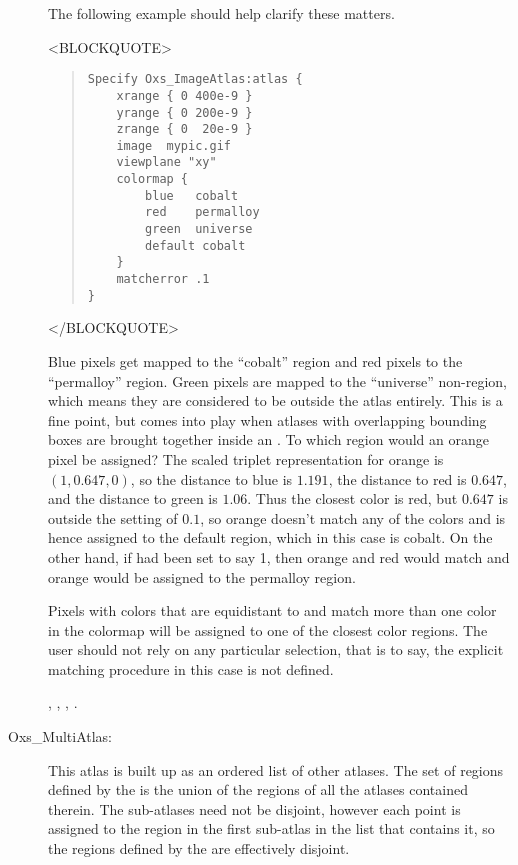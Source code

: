 \begin{description}
The following example should help clarify these matters.
\begin{rawhtml}
<BLOCKQUOTE>
\end{rawhtml}
\begin{quote}
\begin{verbatim}
Specify Oxs_ImageAtlas:atlas {
    xrange { 0 400e-9 }
    yrange { 0 200e-9 }
    zrange { 0  20e-9 }
    image  mypic.gif
    viewplane "xy"
    colormap {
        blue   cobalt
        red    permalloy
        green  universe
        default cobalt
    }
    matcherror .1
}
\end{verbatim}
\end{quote}
\begin{rawhtml}
</BLOCKQUOTE>
\end{rawhtml}
Blue pixels get mapped to the ``cobalt'' region and red pixels
to the ``permalloy'' region.  Green pixels are mapped to the
``universe'' non-region, which means they are considered to be outside
the atlas entirely.  This is a fine point, but comes into
play when atlases with overlapping bounding boxes are brought together
inside an .  To which region would an orange pixel
be assigned?  The scaled triplet representation for orange is
$(1,0.647,0)$, so the distance to blue is $1.191$, the distance to red
is $0.647$, and the distance to green is $1.06$.  Thus the closest color
is red, but $0.647$ is outside the  setting of $0.1$, so
orange doesn't match any of the colors and is hence assigned to the
default region, which in this case is cobalt.  On the other hand, if
 had been set to say 1, then orange and red would match
and orange would be assigned to the permalloy region.

Pixels with colors that are equidistant to and match more than one color
in the colormap will be assigned to one of the closest color regions.
The user should not rely on any particular selection, that is to say,
the explicit matching procedure in this case is not defined.

\begin{ExampleMifs}
 , , , .
\end{ExampleMifs}

\item[Oxs\_MultiAtlas:]
%
This atlas is built up as an ordered list of
other atlases.  The set of regions defined by the 
is the union of the regions of all the atlases contained therein.  The
sub-atlases need not be disjoint, however each point is assigned to the
region in the first sub-atlas in the list that contains it, so the
regions defined by the  are effectively disjoint.


\end{description}
